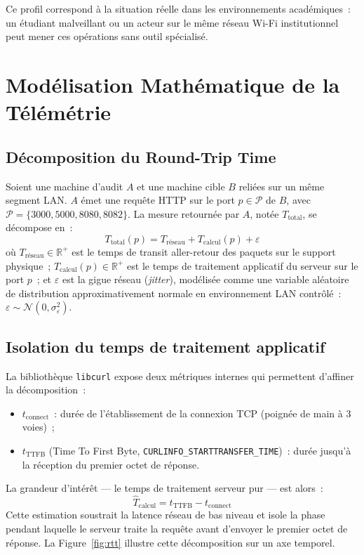 \documentclass[10pt,conference,compsoc]{IEEEtran}
\begin{document}
Ce profil correspond à la situation réelle dans les environnements
académiques~: un étudiant malveillant ou un acteur sur le même réseau
Wi-Fi institutionnel peut mener ces opérations sans outil spécialisé.

\section{Modélisation Mathématique de la Télémétrie}
\label{sec:modelisation}

\subsection{Décomposition du Round-Trip Time}

Soient une machine d'audit $A$ et une machine cible $B$ reliées sur un
même segment LAN. $A$ émet une requête HTTP sur le port $p \in \mathcal{P}$
de $B$, avec $\mathcal{P} = \{3000, 5000, 8080, 8082\}$. La mesure
retournée par $A$, notée $T_{\mathrm{total}}$, se décompose en~:
\begin{equation}
    T_{\mathrm{total}}(p) = T_{\mathrm{réseau}} + T_{\mathrm{calcul}}(p)
    + \varepsilon
    \label{eq:decomp}
\end{equation}
où $T_{\mathrm{réseau}} \in \mathbb{R}^+$ est le temps de transit aller-retour
des paquets sur le support physique~;
$T_{\mathrm{calcul}}(p) \in \mathbb{R}^+$ est le temps de traitement
applicatif du serveur sur le port $p$~; et $\varepsilon$ est la gigue
réseau (\textit{jitter}), modélisée comme une variable aléatoire de
distribution approximativement normale en environnement LAN contrôlé~:
$\varepsilon \sim \mathcal{N}(0, \sigma_{\varepsilon}^2)$.

\subsection{Isolation du temps de traitement applicatif}

La bibliothèque \texttt{libcurl} expose deux métriques internes qui
permettent d'affiner la décomposition~:
\begin{itemize}
    \item $t_{\mathrm{connect}}$~: durée de l'établissement de la
      connexion TCP (poignée de main à 3 voies)~;
    \item $t_{\mathrm{TTFB}}$ (Time To First Byte, \texttt{CURLINFO\_STARTTRANSFER\_TIME})~:
      durée jusqu'à la réception du premier octet de réponse.
\end{itemize}
La grandeur d'intérêt — le temps de traitement serveur pur — est alors~:
\begin{equation}
    \hat{T}_{\mathrm{calcul}} = t_{\mathrm{TTFB}} - t_{\mathrm{connect}}
    \label{eq:tcalcul}
\end{equation}
Cette estimation soustrait la latence réseau de bas niveau et isole la
phase pendant laquelle le serveur traite la requête avant d'envoyer
le premier octet de réponse. La Figure~\ref{fig:rtt} illustre cette
décomposition sur un axe temporel.
\end{document}
